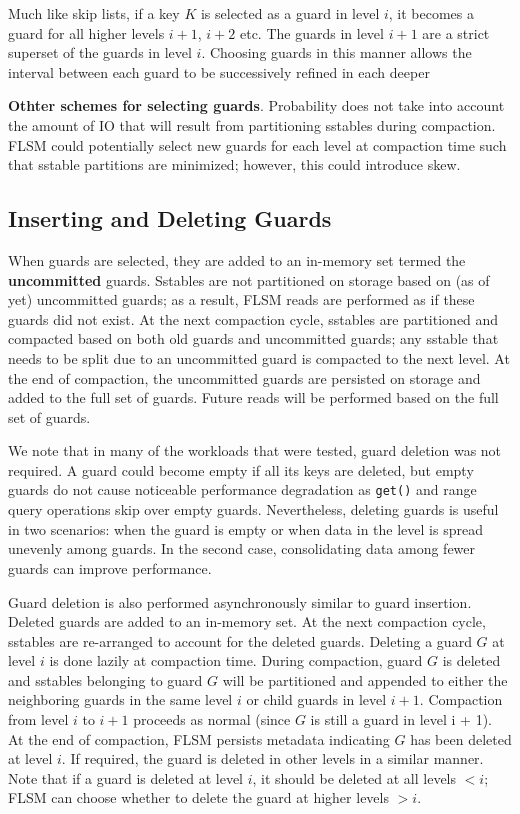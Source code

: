 \documentclass[11pt]{article}
\begin{document}
Much like skip lists, if a key \(K\) is selected as a guard in level \(i\), it becomes a guard for all
higher levels \(i+1\), \(i+2\) etc. The guards in level \(i+1\) are a strict superset of the guards in
level \(i\). Choosing guards in this manner allows the interval between each guard to be successively
refined in each deeper

\textbf{Othter schemes for selecting guards}. Probability does not take into account the amount of IO that will
result from partitioning sstables during compaction. FLSM could potentially select new guards for each
level at compaction time such that sstable partitions are minimized; however, this could introduce
skew.
\subsection{Inserting and Deleting Guards}
\label{sec:orgdd9d192}
When guards are selected, they are added to an in-memory set termed the \textbf{uncommitted} guards. Sstables
are not partitioned on storage based on (as of yet) uncommitted guards; as a result, FLSM reads are
performed as if these guards did not exist. At the next compaction cycle, sstables are partitioned and
compacted based on both old guards and uncommitted guards; any sstable that needs to be split due to
an uncommitted guard is compacted to the next level. At the end of compaction, the uncommitted guards
are persisted on storage and added to the full set of guards. Future reads will be performed based on
the full set of guards.

We note that in many of the workloads that were tested, guard deletion was not required. A guard could
become empty if all its keys are deleted, but empty guards do not cause noticeable performance
degradation as \texttt{get()} and range query operations skip over empty guards. Nevertheless, deleting guards
is useful in two scenarios: when the guard is empty or when data in the level is spread unevenly among
guards. In the second case, consolidating data among fewer guards can improve performance.

Guard deletion is also performed asynchronously similar to guard insertion. Deleted guards are added
to an in-memory set. At the next compaction cycle, sstables are re-arranged to account for the deleted
guards. Deleting a guard \(G\) at level \(i\) is done lazily at compaction time. During compaction,
guard \(G\) is deleted and sstables belonging to guard \(G\) will be partitioned and appended to
either the neighboring guards in the same level \(i\) or child guards in level \(i+1\). Compaction
from level \(i\) to \(i+1\) proceeds as normal (since \(G\) is still a guard in level i + 1). At the
end of compaction, FLSM persists metadata indicating \(G\) has been deleted at level \(i\). If
required, the guard is deleted in other levels in a similar manner. Note that if a guard is deleted at
level \(i\), it should be deleted at all levels \(<i\); FLSM can choose whether to delete the guard at
higher levels \(>i\).
\end{document}
